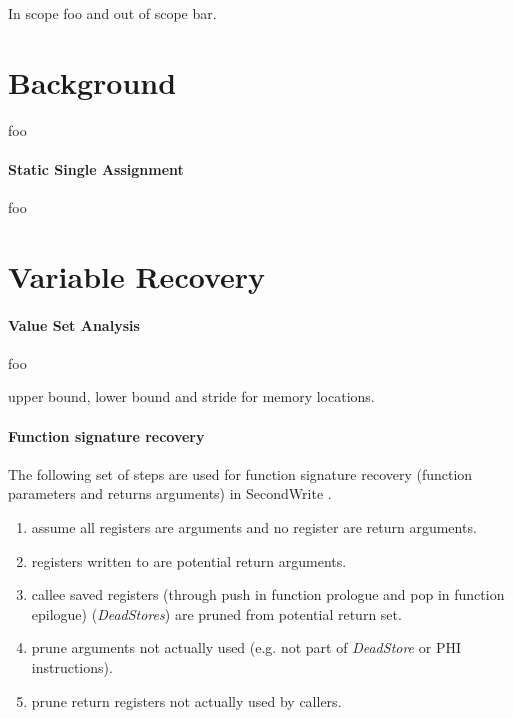 \documentclass[10pt, a4paper, sigplan]{acmart}
\begin{document}

In scope foo and out of scope bar.

\section{Background}

foo

\paragraph{Static Single Assignment}

foo


\section{Variable Recovery}

\paragraph{Value Set Analysis}

foo

upper bound, lower bound and stride for memory locations.

\paragraph{Function signature recovery}

The following set of steps are used for function signature recovery (function parameters and returns arguments) in SecondWrite \cite{scalable_type_detection}.

\begin{enumerate}
	\item assume all registers are arguments and no register are return arguments.
	\item registers written to are potential return arguments.
	\item callee saved registers (through push in function prologue and pop in function epilogue) (\textit{DeadStores}) are pruned from potential return set.
	\item prune arguments not actually used (e.g. not part of \textit{DeadStore} or PHI instructions).
	\item prune return registers not actually used by callers.
\end{enumerate}
\end{document}
